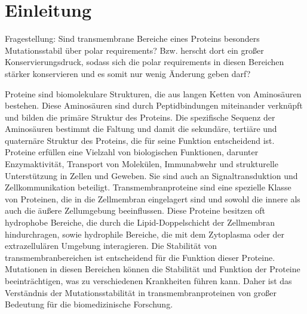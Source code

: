 \documentclass[german,version-2022-01]{uzl-thesis}
\begin{document}
%
%


\chapter{Einleitung}


%
Fragestellung: Sind transmembrane Bereiche eines Proteins besonders Mutationsstabil \"uber polar requirements? Bzw. herscht dort ein gro\ss{}er Konservierungsdruck, sodass sich die polar requirements in diesen Bereichen st\"arker konservieren und es somit nur wenig \"Anderung geben darf? 

Proteine sind biomolekulare Strukturen, die aus langen Ketten von Aminos\"auren bestehen. Diese Aminos\"auren sind durch Peptidbindungen miteinander verkn\"upft und bilden die prim\"are Struktur des Proteins. Die spezifische Sequenz der Aminos\"auren bestimmt die Faltung und damit die sekund\"are, terti\"are und quatern\"are Struktur des Proteins, die f\"ur seine Funktion entscheidend ist. Proteine erf\"ullen eine Vielzahl von biologischen Funktionen, darunter Enzymaktivit\"at, Transport von Molek\"ulen, Immunabwehr und strukturelle Unterst\"utzung in Zellen und Geweben. Sie sind auch an Signaltransduktion und Zellkommunikation beteiligt. Transmembranproteine sind eine spezielle Klasse von Proteinen, die in die Zellmembran eingelagert sind und sowohl die innere als auch die \"au\ss{}ere Zellumgebung beeinflussen. Diese Proteine besitzen oft hydrophobe Bereiche, die durch die Lipid-Doppelschicht der Zellmembran hindurchragen, sowie hydrophile Bereiche, die mit dem Zytoplasma oder der extrazellul\"aren Umgebung interagieren. Die Stabilit\"at von transmembranbereichen ist entscheidend f\"ur die Funktion dieser Proteine. Mutationen in diesen Bereichen k\"onnen die Stabilit\"at und Funktion der Proteine beeintr\"achtigen, was zu verschiedenen Krankheiten f\"uhren kann. Daher ist das Verst\"andnis der Mutationsstabilit\"at in transmembranproteinen von gro\ss{}er Bedeutung f\"ur die biomedizinische Forschung.
\end{document}
